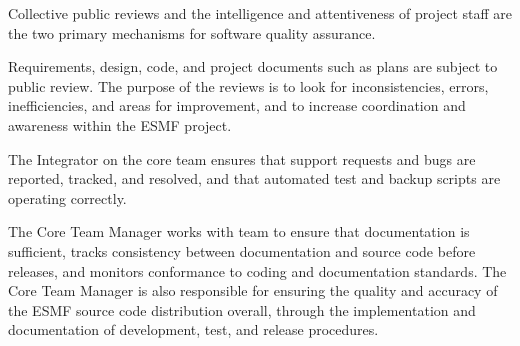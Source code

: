 Collective public reviews and the intelligence and attentiveness of
project staff are the two primary mechanisms for software quality assurance.  

Requirements, design, code, and project documents such as plans
are subject to public review.  The purpose of the reviews is
to look for inconsistencies, errors, inefficiencies, and areas
for improvement, and to increase coordination and awareness within
the ESMF project.

The Integrator on the core team ensures that support requests
and bugs are reported, tracked, and resolved, and that automated
test and backup scripts are operating correctly.

The Core Team Manager works with team to ensure that documentation
is sufficient, tracks consistency between documentation and source
code before releases, and monitors conformance to coding and
documentation standards.  The Core Team Manager is also responsible
for ensuring the quality and accuracy of the ESMF source code
distribution overall, through the implementation and documentation of
development, test, and release procedures.










